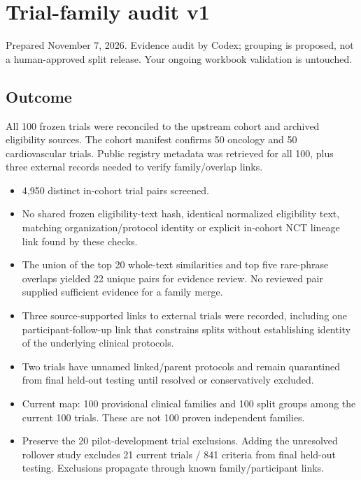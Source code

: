 \documentclass[10pt,letterpaper]{article}
\begin{document}
\section{Trial-family audit v1}\label{audit-trial-family-audit-v1}\label{sec:familyaudit}

Prepared November 7, 2026. Evidence audit by Codex; grouping is proposed, not a human-approved split release. Your ongoing workbook validation is untouched.

\subsection{Outcome}\label{audit-outcome}

All 100 frozen trials were reconciled to the upstream cohort and archived eligibility sources. The cohort manifest confirms 50 oncology and 50 cardiovascular trials. Public registry metadata was retrieved for all 100, plus three external records needed to verify family/overlap links.

\begin{itemize}
\item
  4,950 distinct in-cohort trial pairs screened.
\item
  No shared frozen eligibility-text hash, identical normalized eligibility text, matching organization/protocol identity or explicit in-cohort NCT lineage link found by these checks.
\item
  The union of the top 20 whole-text similarities and top five rare-phrase overlaps yielded 22 unique pairs for evidence review. No reviewed pair supplied sufficient evidence for a family merge.
\item
  Three source-supported links to external trials were recorded, including one participant-follow-up link that constrains splits without establishing identity of the underlying clinical protocols.
\item
  Two trials have unnamed linked/parent protocols and remain quarantined from final held-out testing until resolved or conservatively excluded.
\item
  Current map: 100 provisional clinical families and 100 split groups among the current 100 trials. These are not 100 proven independent families.
\item
  Preserve the 20 pilot-development trial exclusions. Adding the unresolved rollover study excludes 21 current trials / 841 criteria from final held-out testing. Exclusions propagate through known family/participant links.
\end{itemize}
\end{document}
